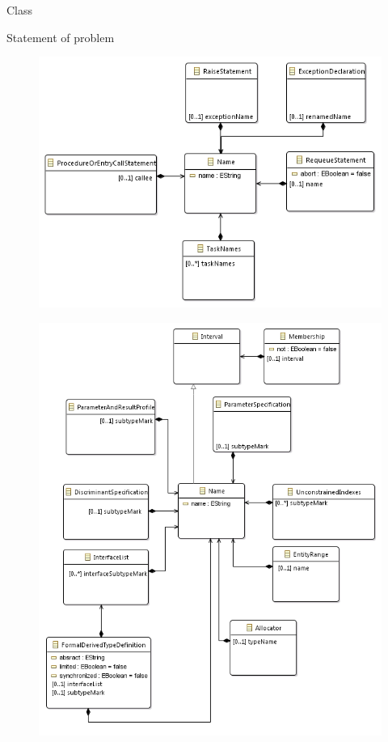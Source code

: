 \documentclass[a4paper]{prjdoc}
\begin{document}
\begin{asection}{Class }
\begin{asection}{Statement of problem}
        \begin{figure}
        \includegraphics[scale=0.99]{"../../model/Class Name used for programs"}
        \label{fig:Class Name used for programs}
        \end{figure} 
     
        \begin{figure}
        \includegraphics[scale=0.91]{"../../model/Class Name used for types"}
        \label{fig:Class Name used for types}
        \end{figure} 
  

\end{asection}
\end{asection}
\end{document}
